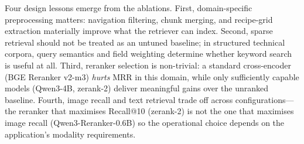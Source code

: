 \documentclass[11pt,a4paper]{article}
\begin{document}
Four design lessons emerge from the ablations. First, domain-specific preprocessing matters: navigation filtering, chunk merging, and recipe-grid extraction materially improve what the retriever can index. Second, sparse retrieval should not be treated as an untuned baseline; in structured technical corpora, query semantics and field weighting determine whether keyword search is useful at all. Third, reranker selection is non-trivial: a standard cross-encoder (BGE Reranker v2-m3) \textit{hurts} MRR in this domain, while only sufficiently capable models (Qwen3-4B, zerank-2) deliver meaningful gains over the unranked baseline. Fourth, image recall and text retrieval trade off across configurations---the reranker that maximises Recall@10 (zerank-2) is not the one that maximises image recall (Qwen3-Reranker-0.6B) so the operational choice depends on the application's modality requirements.
\end{document}
